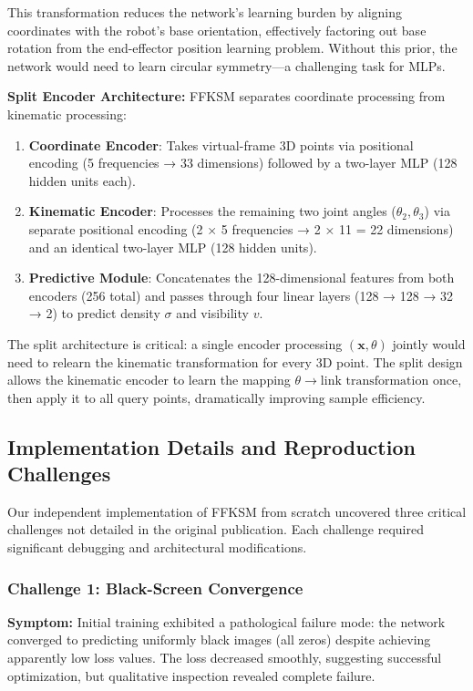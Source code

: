 \documentclass[12pt,a4paper,oneside]{report}
\begin{document}
This transformation reduces the network's learning burden by aligning coordinates with the robot's base orientation, effectively factoring out base rotation from the end-effector position learning problem. Without this prior, the network would need to learn circular symmetry—a challenging task for MLPs.

\textbf{Split Encoder Architecture:} FFKSM separates coordinate processing from kinematic processing:

\begin{enumerate}
    \item \textbf{Coordinate Encoder}: Takes virtual-frame 3D points via positional encoding (5 frequencies → 33 dimensions) followed by a two-layer MLP (128 hidden units each).
    \item \textbf{Kinematic Encoder}: Processes the remaining two joint angles ($\theta_2, \theta_3$) via separate positional encoding (2 × 5 frequencies → 2 × 11 = 22 dimensions) and an identical two-layer MLP (128 hidden units).
    \item \textbf{Predictive Module}: Concatenates the 128-dimensional features from both encoders (256 total) and passes through four linear layers (128 → 128 → 32 → 2) to predict density $\sigma$ and visibility $v$.
\end{enumerate}

The split architecture is critical: a single encoder processing $(\mathbf{x}, \theta)$ jointly would need to relearn the kinematic transformation for every 3D point. The split design allows the kinematic encoder to learn the mapping $\theta \rightarrow \text{link transformation}$ once, then apply it to all query points, dramatically improving sample efficiency.

\subsection{Implementation Details and Reproduction Challenges}

Our independent implementation of FFKSM from scratch uncovered three critical challenges not detailed in the original publication. Each challenge required significant debugging and architectural modifications.

\subsubsection{Challenge 1: Black-Screen Convergence}

\textbf{Symptom:} Initial training exhibited a pathological failure mode: the network converged to predicting uniformly black images (all zeros) despite achieving apparently low loss values. The loss decreased smoothly, suggesting successful optimization, but qualitative inspection revealed complete failure.
\end{document}
